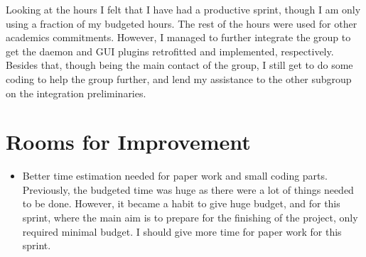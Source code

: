 \documentclass{article}
\begin{document}
Looking at the hours I felt that I have had a productive sprint, though I am only using a fraction of my budgeted hours. The rest of the hours were used for other academics commitments. However, I managed to further integrate the group to get the daemon and GUI plugins retrofitted and implemented, respectively. Besides that, though being the main contact of the group, I still get to do some coding to help the group further, and lend my assistance to the other subgroup on the integration preliminaries. 

\section*{Rooms for Improvement}

\begin{itemize}
   \item Better time estimation needed for paper work and small coding parts. Previously, the budgeted time was huge as there were a lot of things needed to be done. However, it became a habit to give huge budget, and for this sprint, where the main aim is to prepare for the finishing of the project, only required minimal budget. I should give more time for paper work for this sprint. 
\end{itemize}
\end{document}
